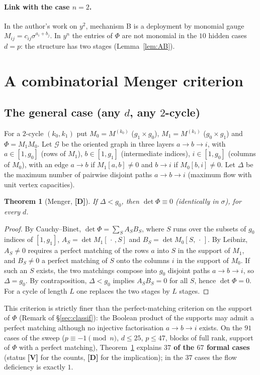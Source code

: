 \documentclass[11pt,a4paper]{article}
\newtheorem{theorem}{Theorem}[section]
\begin{document}
\paragraph{Link with the case $n=2$.} In the author's work on $y^2$, mechanism B
is a deployment by monomial gauge $M_{ij}=c_{ij}\sigma^{a_i+b_j}$. In $y^n$ the
entries of $\Phi$ are not monomial in the $10$ hidden cases $d=p$: the structure
has two stages (Lemma~\ref{lem:AB}).

\section{A combinatorial Menger criterion}
\label{sec:menger}

\subsection*{The general case (any $d$, any $2$-cycle)}

For a $2$-cycle $(k_0,k_1)$ put $M_0=M^{(k_0)}$ ($g_1\times g_0$),
$M_1=M^{(k_1)}$ ($g_0\times g_1$) and $\Phi=M_1M_0$. Let $\mathcal G$ be the
oriented graph in three layers $a\to b\to i$, with $a\in[1,g_0]$ (rows of $M_1$),
$b\in[1,g_1]$ (intermediate indices), $i\in[1,g_0]$ (columns of $M_0$), with an
edge $a\to b$ if $M_1[a,b]\neq0$ and $b\to i$ if $M_0[b,i]\neq0$. Let $\Delta$
be the maximum number of pairwise disjoint paths $a\to b\to i$ (maximum flow with
unit vertex capacities).

\begin{theorem}[Menger, \textbf{[D]}]
\label{thm:menger}
If $\Delta<g_0$, then $\det\Phi\equiv0$ (identically in $\sigma$), for every $d$.
\end{theorem}

\begin{proof}
By Cauchy--Binet, $\det\Phi=\sum_S A_SB_S$, where $S$ runs over the subsets of
$g_0$ indices of $[1,g_1]$, $A_S=\det M_1[\,\cdot\,,S]$ and
$B_S=\det M_0[S,\,\cdot\,]$. By Leibniz, $A_S\neq0$ requires a perfect matching of
the rows $a$ into $S$ in the support of $M_1$, and $B_S\neq0$ a perfect matching
of $S$ onto the columns $i$ in the support of $M_0$. If such an $S$ exists, the
two matchings compose into $g_0$ disjoint paths $a\to b\to i$, so $\Delta=g_0$.
By contraposition, $\Delta<g_0$ implies $A_SB_S=0$ for all $S$, hence
$\det\Phi=0$. For a cycle of length $L$ one replaces the two stages by $L$
stages. \end{proof}

This criterion is strictly finer than the perfect-matching criterion on the
support of $\Phi$ (Remark of \S\ref{sec:classif}): the Boolean product of the
supports may admit a perfect matching although no injective factorisation
$a\to b\to i$ exists. On the $91$ cases of the sweep ($p\equiv-1\pmod n$,
$d\le25$, $p\le47$, blocks of full rank, support of $\Phi$ with a perfect
matching), Theorem~\ref{thm:menger} explains \textbf{$37$ of the $67$ formal
cases} (status \textbf{[V]} for the counts, \textbf{[D]} for the implication);
in the $37$ cases the flow deficiency is exactly $1$.
\end{document}

